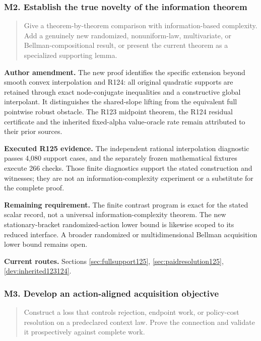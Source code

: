 \subsubsection{M2. Establish the true novelty of the information theorem}

\begin{quote}\small
Give a theorem-by-theorem comparison with information-based complexity. Add a genuinely new randomized, nonuniform-law, multivariate, or Bellman-compositional result, or present the current theorem as a specialized supporting lemma.
\end{quote}

\noindent\textbf{Author amendment.} The new proof identifies the specific extension beyond smooth convex interpolation and R124: all original quadratic supports are retained through exact node-conjugate inequalities and a constructive global interpolant. It distinguishes the shared-slope lifting from the equivalent full pointwise robust obstacle. The R123 midpoint theorem, the R124 residual certificate and the inherited fixed-alpha value-oracle rate remain attributed to their prior sources.

\noindent\textbf{Executed R125 evidence.} The independent rational interpolation diagnostic passes 4,080 support cases, and the separately frozen mathematical fixtures execute 266 checks. Those finite diagnostics support the stated construction and witnesses; they are not an information-complexity experiment or a substitute for the complete proof.

\noindent\textbf{Remaining requirement.} The finite contrast program is exact for the stated scalar record, not a universal information-complexity theorem. The new stationary-bracket randomized-action lower bound is likewise scoped to its reduced interface. A broader randomized or multidimensional Bellman acquisition lower bound remains open.

\noindent\textbf{Current routes.} Sections \ref{sec:fullsupport125}, \ref{sec:paidresolution125}, \ref{dev:inherited123124}.

\subsubsection{M3. Develop an action-aligned acquisition objective}

\begin{quote}\small
Construct a loss that controls rejection, endpoint work, or policy-cost resolution on a predeclared context law. Prove the connection and validate it prospectively against complete work.
\end{quote}

